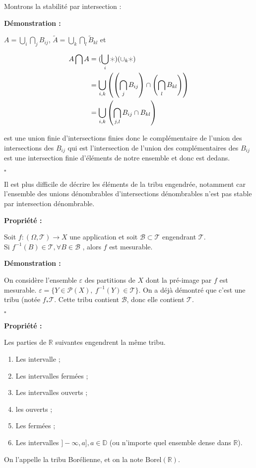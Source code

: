 \documentclass[10pt,a4paper,notitlepage ]{report}
\newcommand{\R}{\mathbb R}
\newcommand{\T}{\mathcal T}
\newcommand{\B}{\mathcal B}
\newcommand{\1}{\mathds 1}
\newcommand{\eps}{\varepsilon}
\newcommand{\borel}{\mathrm{Borel}}
\newcounter{th}
\newenvironment{propriete}[1][]{
	\begin{tcolorbox}
		\textbf{Propriété #1 : }
}
{\end{tcolorbox}}
\newenvironment{demo}[1][]{

	\textbf{Démonstration #1 :}
}{\begin{flushright}
	$\square$
\end{flushright}
}
\begin{document}
Montrons la stabilité par intersection : 

\begin{demo}
$A = \bigcup _ i \bigcap _j B_{ij} $, $\tilde A  = \bigcup_k \bigcap _ l \tilde B_{kl} $ et 

\begin{align*}
A \bigcap A &= (\bigcup _i \varhexstar ) ( \cup _ k \varhexstar ) \\
&= \bigcup_{i,k} \left( \left( \bigcap_j B_{ij} \right) \cap \left( \bigcap_l B_{kl} \right) \right) \\
&= \bigcup _{i,k} \left( \bigcap_{j,l} B_{ij} \cap B_{kl} \right) 
\end{align*}

est une union finie d'intersections finies donc le complémentaire de l'union des intersections des $B_{ij}$ qui est l'intersection de l'union des complémentaires des $B_{ij}$ est une intersection finie d'éléments de notre ensemble et donc est dedans.
\end{demo}

Il est plus difficile de décrire les éléments de la tribu engendrée, notamment car l'ensemble des unions dénombrables d'intersections dénombrables n'est pas stable par intersection dénombrable. 

\begin{propriete}
Soit $f:(\Omega,\T) \rightarrow X$ une application et soit $\B \subset \T $ engendrant $\T$. \\
Si $f^{-1} (B)\in \T , \forall B \in \B$ , alors $f$ est mesurable.
\end{propriete}

\begin{demo}
On considère l'ensemble $\eps$ des partitions de $X$ dont la pré-image par $f$ est mesurable. $ \eps = \lbrace Y \in \mathcal P (X), \ f^{-1}(Y) \in \T \rbrace $. 
On a déjà démontré que c'est une tribu (notée $f_* \T$. Cette tribu contient $\B$, donc elle contient $\T$. 

\end{demo}

\begin{propriete}
Les parties de $\R$ suivantes engendrent la même tribu.
	\begin{enumerate}
		\item Les intervalle ;
		\item Les intervalles fermées ;
		\item Les intervalles ouverts ;
		\item les ouverts ;
		\item Les fermées ;
		\item Les intervalles $] - \infty , a ], a \in \mathbb{D} $ (ou n'importe quel ensemble dense dans $\R$).
	\end{enumerate}
On l'appelle la tribu Borélienne, et on la note $\borel(\R)$.

\end{propriete}
\end{document}
